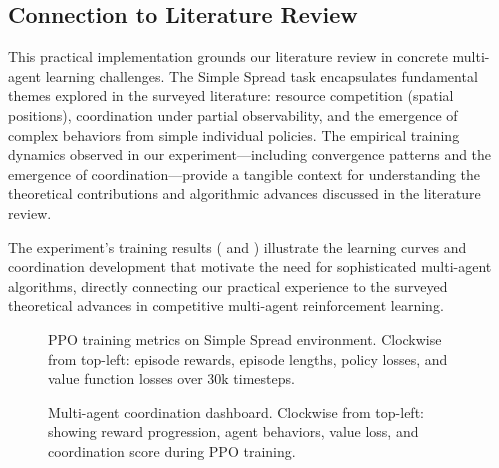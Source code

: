 \subsection{Connection to Literature Review}

This practical implementation grounds our literature review in concrete multi-agent learning challenges. The Simple Spread task encapsulates fundamental themes explored in the surveyed literature: resource competition (spatial positions), coordination under partial observability, and the emergence of complex behaviors from simple individual policies. The empirical training dynamics observed in our experiment—including convergence patterns and the emergence of coordination—provide a tangible context for understanding the theoretical contributions and algorithmic advances discussed in the literature review.

The experiment's training results ( and ) illustrate the learning curves and coordination development that motivate the need for sophisticated multi-agent algorithms, directly connecting our practical experience to the surveyed theoretical advances in competitive multi-agent reinforcement learning.

\begin{figure}[htpb]
    \centering
    
    \caption{PPO training metrics on Simple Spread environment. Clockwise from top-left: episode rewards, episode lengths, policy losses, and value function losses over 30k timesteps.}
    \label{fig:training_history}
\end{figure}

\begin{figure}[htpb]
    \centering
    
    \caption{Multi-agent coordination dashboard. Clockwise from top-left: showing reward progression, agent behaviors, value loss, and coordination score during PPO training.}
    \label{fig:training_dashboard}
\end{figure}